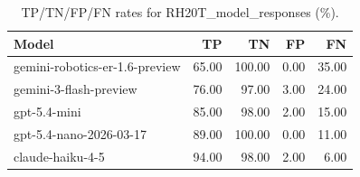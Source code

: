 \begin{table}
\caption{TP/TN/FP/FN rates for RH20T_model_responses (\%).}
\label{tab:rh20t_model_responses_model_rates}
\begin{tabular}{lrrrr}
\toprule
Model & TP & TN & FP & FN \\
\midrule
gemini-robotics-er-1.6-preview & 65.00 & 100.00 & 0.00 & 35.00 \\
gemini-3-flash-preview & 76.00 & 97.00 & 3.00 & 24.00 \\
gpt-5.4-mini & 85.00 & 98.00 & 2.00 & 15.00 \\
gpt-5.4-nano-2026-03-17 & 89.00 & 100.00 & 0.00 & 11.00 \\
claude-haiku-4-5 & 94.00 & 98.00 & 2.00 & 6.00 \\
\bottomrule
\end{tabular}
\end{table}
